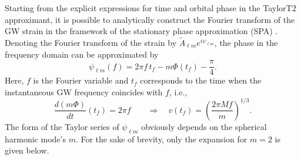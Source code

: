 Starting from the explicit expressions for time and orbital phase in
the TaylorT2 approximant, it is possible to analytically construct the
Fourier transform of the GW strain in the
framework of the stationary phase approximation (SPA)
\cite{Damour:2000zb,Damour:2002kr,Arun:2004hn}. Denoting the Fourier
transform of the strain by $\tilde A_{\ell m} e^{i
\psi_{\ell m}}$, the phase in the frequency domain can be approximated
by
\begin{equation}
 \psi_{\ell m}(f) = 2 \pi f \, t_f - m \Phi(t_f) - \frac{\pi}{4}. 
\end{equation}
Here, $f$ is the Fourier variable and $t_f$ corresponds to the time
when the instantaneous GW frequency coincides with $f$, i.e.,
\begin{equation}
 \frac{d (m \Phi)}{dt} (t_f) = 2 \pi f \qquad \Rightarrow \quad
v(t_f) = \left( \frac{2 \pi M f}{m} \right)^{1/3}. \label{eq:vfreq}
\end{equation}
%
The form of the Taylor series of $\psi_{\ell m}$ obviously depends on
the spherical harmonic mode's $m$. For the sake of brevity, only the
expansion
for $m=2$ is given below.
